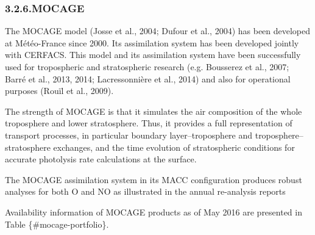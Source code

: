 \documentclass[9pt]{report}
\begin{document}
\subsubsection{3.2.6.\hspace*{0.5em}MOCAGE}\label{sec-mocage}%

\noindent{}The MOCAGE model (Josse et al., 2004; Dufour et al., 2004) has been developed at Météo-France since 2000. 
Its assimilation system has been developed jointly with CERFACS. 
This model and its assimilation system have been successfully used for tropospheric and stratospheric research (e.g. Bousserez et al., 2007; Barré et al., 2013, 2014; Lacressonnière et al., 2014) and also for operational purposes (Rouïl et al., 2009).%

The strength of MOCAGE is that it simulates the air composition of the whole troposphere and lower stratosphere. 
Thus, it provides a full representation of transport processes, in particular boundary layer–troposphere and troposphere–stratosphere exchanges, and the time evolution of stratospheric conditions for accurate photolysis rate calculations at the surface.%

The MOCAGE assimilation system in its MACC conﬁguration produces robust analyses for both O and NO as illustrated in the annual re-analysis reports %

Availability information of MOCAGE products as of May 2016 are presented in Table \{\#mocage-portfolio\}.%
\end{document}
